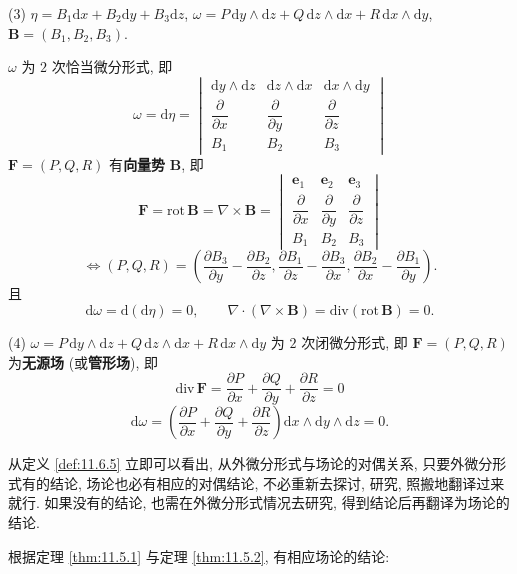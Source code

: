 \begin{definition}
(3) $\eta=B_{1}\mathrm{d}x+B_{2}\mathrm{d}y+B_{3}\mathrm{d}z$, $\omega=P\,\mathrm{d}y\wedge\mathrm{d}z+Q\,\mathrm{d}z\wedge\mathrm{d}x+R\,\mathrm{d}x\wedge\mathrm{d}y$, $\boldsymbol{B}=(B_{1},B_{2},B_{3})$.

$\omega$ 为 $2$ 次恰当微分形式, 即
\[
\omega=\mathrm{d}\eta=\begin{vmatrix}\mathrm{d}y\wedge\mathrm{d}z&\mathrm{d}z\wedge\mathrm{d}x&\mathrm{d}x\wedge\mathrm{d}y\\ \dfrac{\partial}{\partial x}&\dfrac{\partial}{\partial y}&\dfrac{\partial}{\partial z}\\ B_{1}&B_{2}&B_{3}\end{vmatrix}
\]
$\boldsymbol{F}=(P,Q,R)$ 有\textbf{向量势} $\boldsymbol{B}$, 即
\[
\boldsymbol{F}=\mathrm{rot}\,\boldsymbol{B}=\nabla\times\boldsymbol{B}=\begin{vmatrix}\boldsymbol{e}_{1}&\boldsymbol{e}_{2}&\boldsymbol{e}_{3}\\ \dfrac{\partial}{\partial x}&\dfrac{\partial}{\partial y}&\dfrac{\partial}{\partial z}\\ B_{1}&B_{2}&B_{3}\end{vmatrix}
\]
\[
\Longleftrightarrow(P,Q,R)=\left(\frac{\partial B_{3}}{\partial y}-\frac{\partial B_{2}}{\partial z},\frac{\partial B_{1}}{\partial z}-\frac{\partial B_{3}}{\partial x},\frac{\partial B_{2}}{\partial x}-\frac{\partial B_{1}}{\partial y}\right).
\]
且
\[
\mathrm{d}\omega=\mathrm{d}(\mathrm{d}\eta)=0,\qquad\nabla\cdot(\nabla\times\boldsymbol{B})=\mathrm{div}(\mathrm{rot}\,\boldsymbol{B})=0.
\]

(4) $\omega=P\,\mathrm{d}y\wedge\mathrm{d}z+Q\,\mathrm{d}z\wedge\mathrm{d}x+R\,\mathrm{d}x\wedge\mathrm{d}y$ 为 $2$ 次闭微分形式, 即 $\boldsymbol{F}=(P,Q,R)$ 为\textbf{无源场} (或\textbf{管形场}), 即
\[
\mathrm{div}\,\boldsymbol{F}=\frac{\partial P}{\partial x}+\frac{\partial Q}{\partial y}+\frac{\partial R}{\partial z}=0
\]
\[
\mathrm{d}\omega=\left(\frac{\partial P}{\partial x}+\frac{\partial Q}{\partial y}+\frac{\partial R}{\partial z}\right)\mathrm{d}x\wedge\mathrm{d}y\wedge\mathrm{d}z=0.
\]
\end{definition}

从定义 \ref{def:11.6.5} 立即可以看出, 从外微分形式与场论的对偶关系, 只要外微分形式有的结论, 场论也必有相应的对偶结论, 不必重新去探讨, 研究, 照搬地翻译过来就行. 如果没有的结论, 也需在外微分形式情况去研究, 得到结论后再翻译为场论的结论.

根据定理 \ref{thm:11.5.1} 与定理 \ref{thm:11.5.2}, 有相应场论的结论:

